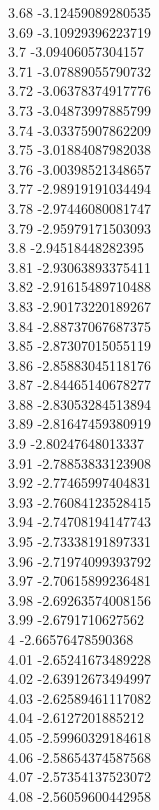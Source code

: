 {3.68	-3.12459089280535\\
3.69	-3.10929396223719\\
3.7	-3.09406057304157\\
3.71	-3.07889055790732\\
3.72	-3.06378374917776\\
3.73	-3.04873997885799\\
3.74	-3.03375907862209\\
3.75	-3.01884087982038\\
3.76	-3.00398521348657\\
3.77	-2.98919191034494\\
3.78	-2.97446080081747\\
3.79	-2.95979171503093\\
3.8	-2.94518448282395\\
3.81	-2.93063893375411\\
3.82	-2.91615489710488\\
3.83	-2.90173220189267\\
3.84	-2.88737067687375\\
3.85	-2.87307015055119\\
3.86	-2.85883045118176\\
3.87	-2.84465140678277\\
3.88	-2.83053284513894\\
3.89	-2.81647459380919\\
3.9	-2.80247648013337\\
3.91	-2.78853833123908\\
3.92	-2.77465997404831\\
3.93	-2.76084123528415\\
3.94	-2.74708194147743\\
3.95	-2.73338191897331\\
3.96	-2.71974099393792\\
3.97	-2.70615899236481\\
3.98	-2.69263574008156\\
3.99	-2.6791710627562\\
4	-2.66576478590368\\
4.01	-2.65241673489228\\
4.02	-2.63912673494997\\
4.03	-2.62589461117082\\
4.04	-2.6127201885212\\
4.05	-2.59960329184618\\
4.06	-2.58654374587568\\
4.07	-2.57354137523072\\
4.08	-2.56059600442958\\
}

